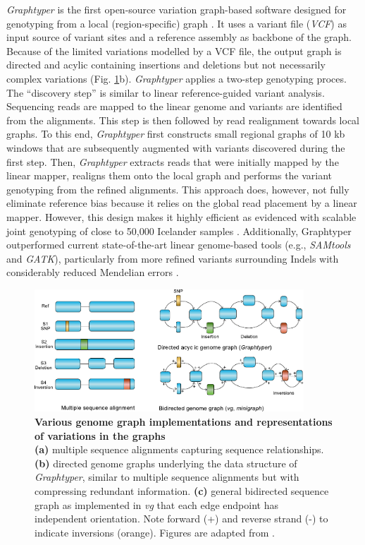 \documentclass[../main.tex]{subfiles}
\begin{document}
\emph{Graphtyper }is the first open-source variation graph-based software designed for genotyping from a local (region-specific) graph \citep{eggertsson2017graphtyper,eggertsson2019graphtyper2}. It uses a variant file (\emph{VCF}) as input source of variant sites and a reference assembly as backbone of the graph. Because of the limited variations modelled by a VCF file, the output graph is directed and acylic containing insertions and deletions but not necessarily complex variations (Fig. \ref{fig15:mut}b). \emph{Graphtyper} applies a two-step genotyping proces. The  “discovery step” is similar to linear reference-guided variant analysis. Sequencing reads are mapped to the linear genome and variants are identified from the alignments. This step is then followed by read realignment towards local graphs. To this end, \emph{Graphtyper} first constructs small regional graphs of 10 kb windows that are subsequently augmented with variants discovered during the first step. Then, \emph{Graphtyper} extracts reads that were initially mapped by the linear mapper, realigns them onto the local graph and performs the variant genotyping from the refined alignments. This approach does, however, not  fully  eliminate reference bias because it relies on the global read placement by a linear mapper. However, this design makes it highly efficient as evidenced with scalable joint genotyping of close to 50,000 Icelander samples \citep{eggertsson2019graphtyper2}. Additionally, Graphtyper outperformed current state-of-the-art linear genome-based tools (e.g., \emph{SAMtools} and \emph{GATK}), particularly from more refined variants surrounding Indels with considerably reduced Mendelian errors \citep{eggertsson2017graphtyper}.

\begin{figure}[!htb]
    \centering
    \includegraphics[width=0.9\textwidth]{intro/fig5.pdf}
        \vspace{3mm}
        \caption[Genetic variant representation in the genome graphs]{\textbf{Various genome graph implementations and representations of variations in the graphs} \\
        \footnotesize{\textbf{(a)} multiple sequence alignments capturing sequence relationships. \textbf{(b)} directed genome graphs underlying the data structure of \emph{Graphtyper}, similar to multiple sequence alignments but with compressing redundant information. \textbf{(c)} general bidirected sequence graph as implemented in \emph{vg} that each edge endpoint has independent orientation. Note  forward (+) and reverse strand (-) to indicate inversions (orange). Figures are adapted from \citep{eizenga2020pangenome}.}}
        \label{fig15:mut}
\end{figure}
\end{document}
